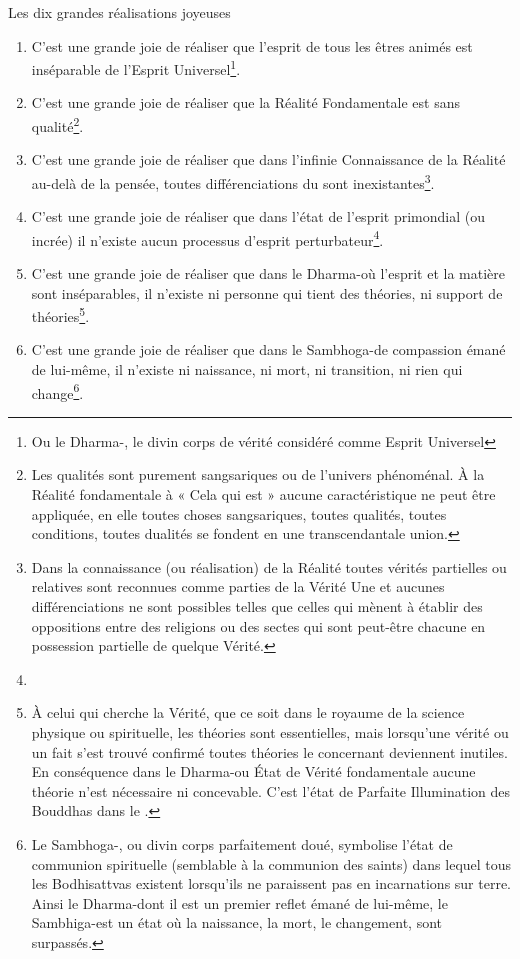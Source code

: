 \documentclass[10pt]{book}
\makeatletter
\renewcommand{\section}{\@startsection{section}{0}{0mm}
   {\baselineskip}
   {\baselineskip}{\normalfont\normalsize\scshape\centering}
}
\makeatother
\begin{document}
\section{Les dix grandes réalisations joyeuses}
\begin{enumerate}[1.-]
\item C'est une grande joie de réaliser que l'esprit de tous les êtres animés est inséparable de l'Esprit Universel\footnote{Ou le Dharma-\kaya, le divin corps de vérité considéré comme Esprit Universel}.
\item C'est une grande joie de réaliser que la Réalité Fondamentale est sans qualité\footnote{Les qualités sont purement sangsariques ou de l'univers phénoménal. À la Réalité fondamentale à « Cela qui est » aucune caractéristique ne peut être appliquée, en elle toutes choses sangsariques, toutes qualités, toutes conditions, toutes dualités se fondent en une transcendantale union.}.
\item C'est une grande joie de réaliser que dans l'infinie Connaissance de la Réalité au-delà de la pensée, toutes différenciations du \samsara sont inexistantes\footnote{Dans la connaissance (ou réalisation) de la Réalité toutes vérités partielles ou relatives sont reconnues comme parties de la Vérité Une et aucunes différenciations ne sont possibles telles que celles qui mènent à établir des oppositions entre des religions ou des sectes qui sont peut-être chacune en possession partielle de quelque Vérité.}.
\item C'est une grande joie de réaliser que dans l'état de l'esprit primondial (ou incrée) il n'existe aucun processus d'esprit perturbateur\footnote{}. %
\item C'est une grande joie de réaliser que dans le Dharma-\kaya où l'esprit et la matière sont inséparables, il n'existe ni personne qui tient des théories, ni support de théories\footnote{À celui qui cherche la Vérité, que ce soit dans le royaume de la science physique ou spirituelle, les théories sont essentielles, mais lorsqu'une vérité ou un fait s'est trouvé confirmé toutes théories le concernant deviennent inutiles. En conséquence dans le Dharma-\kaya ou État de Vérité fondamentale aucune théorie n'est nécessaire ni concevable. C'est l'état de Parfaite Illumination des Bouddhas dans le \nirvana.}.
\item C'est une grande joie de réaliser que dans le Sambhoga-\kaya de compassion émané de lui-même, il n'existe ni naissance, ni mort, ni transition, ni rien qui change\footnote{Le Sambhoga-\kaya, ou divin corps parfaitement doué, symbolise l'état de communion spirituelle (semblable à la communion des saints) dans lequel tous les Bodhisattvas existent lorsqu'ils ne paraissent pas en incarnations sur terre. Ainsi le Dharma-\kaya dont il est un premier reflet émané de lui-même, le Sambhiga-\kaya est un état où la naissance, la mort, le changement, sont surpassés.}.

\end{enumerate}
\end{document}
